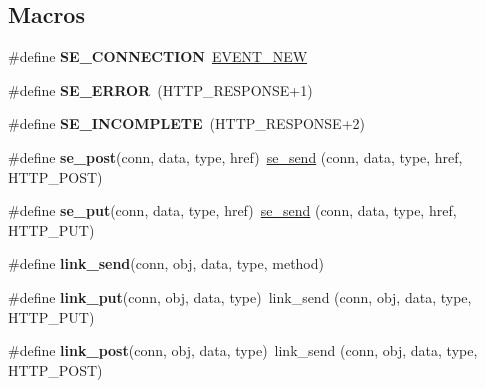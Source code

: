 \subsection*{Macros}
\begin{DoxyCompactItemize}
\item 
\mbox{\label{group__se__connection_ga0797b07932619a4e69970f98e664975e}} 
\#define {\bfseries S\+E\+\_\+\+C\+O\+N\+N\+E\+C\+T\+I\+ON}~\hyperlink{group__event_gga2628ea8d12e8b2563c32f05dc7fff6faa747b63b45296ad40109256f1a3c93bb7}{E\+V\+E\+N\+T\+\_\+\+N\+EW}
\item 
\mbox{\label{group__se__connection_gaed97bc02f1ccb365ae1d206ec8e1fedc}} 
\#define {\bfseries S\+E\+\_\+\+E\+R\+R\+OR}~(H\+T\+T\+P\+\_\+\+R\+E\+S\+P\+O\+N\+SE+1)
\item 
\mbox{\label{group__se__connection_ga34e0cc3dfc977d99a60e046da5edd259}} 
\#define {\bfseries S\+E\+\_\+\+I\+N\+C\+O\+M\+P\+L\+E\+TE}~(H\+T\+T\+P\+\_\+\+R\+E\+S\+P\+O\+N\+SE+2)
\item 
\mbox{\label{group__se__connection_gacc114dc18a79e463ea4eccd547a6bb6c}} 
\#define {\bfseries se\+\_\+post}(conn,  data,  type,  href)~\hyperlink{group__se__connection_ga0a92824fc6a6d3ed2bdf433ba00aebc0}{se\+\_\+send} (conn, data, type, href, H\+T\+T\+P\+\_\+\+P\+O\+ST)
\item 
\mbox{\label{group__se__connection_gacc91661d3f4cf8a4ca3c949534a2e1dc}} 
\#define {\bfseries se\+\_\+put}(conn,  data,  type,  href)~\hyperlink{group__se__connection_ga0a92824fc6a6d3ed2bdf433ba00aebc0}{se\+\_\+send} (conn, data, type, href, H\+T\+T\+P\+\_\+\+P\+UT)
\item 
\#define {\bfseries link\+\_\+send}(conn,  obj,  data,  type,  method)
\item 
\mbox{\label{group__se__connection_ga96bf3a90974ba3a1da538c16e4887043}} 
\#define {\bfseries link\+\_\+put}(conn,  obj,  data,  type)~link\+\_\+send (conn, obj, data, type, H\+T\+T\+P\+\_\+\+P\+UT)
\item 
\mbox{\label{group__se__connection_ga1535da8d60ab0c1462e8f2a02f798bd3}} 
\#define {\bfseries link\+\_\+post}(conn,  obj,  data,  type)~link\+\_\+send (conn, obj, data, type, H\+T\+T\+P\+\_\+\+P\+O\+ST)
\end{DoxyCompactItemize}
